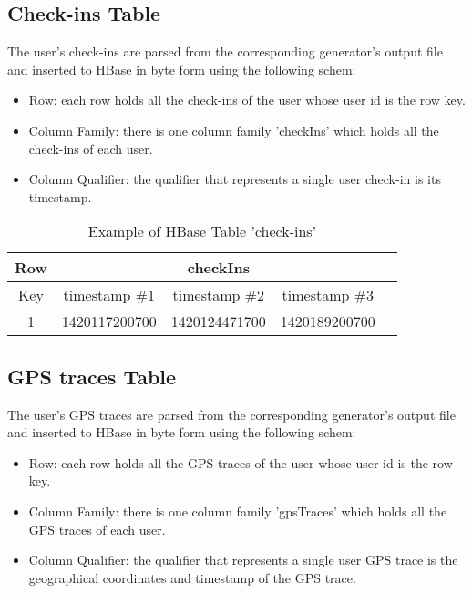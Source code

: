 \subsection{Check-ins Table}

The user's check-ins are parsed from the corresponding generator's output file and inserted to HBase in byte form using the following schem:

\begin{itemize}
 \item Row: each row holds all the check-ins of the user whose user id is the row key.
 \item Column Family: there is one column family 'checkIns' which holds all the check-ins of each user.
 \item Column Qualifier: the qualifier that represents a single user check-in is its timestamp.
\end{itemize}

\begin{table}[H]
\begin{center}
\begin{tabular}{|c|c|c|c|c|}
 \hline
 Row & \multicolumn{3}{|c|}{checkIns} \\
 \hline
 Key & timestamp \#1 & timestamp \#2 & timestamp \#3 \\
 \hline
 1 & 1420117200700 & 1420124471700 & 1420189200700 \\ \hline 
\end{tabular}
\end{center}
\caption{Example of HBase Table 'check-ins'}
\end{table}

\subsection{GPS traces Table}

The user's GPS traces are parsed from the corresponding generator's output file and inserted to HBase in byte form using the following schem:

\begin{itemize}
 \item Row: each row holds all the GPS traces of the user whose user id is the row key.
 \item Column Family: there is one column family 'gpsTraces' which holds all the GPS traces of each user.
 \item Column Qualifier: the qualifier that represents a single user GPS trace is the geographical coordinates and timestamp of the GPS trace.
\end{itemize}

